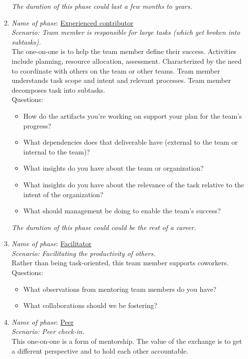 \begin{enumerate}
\begin{itemize}
    \end{itemize}
\textit{The duration of this phase could last a few months to years.}
    \item \textit{Name of phase}: \underline{Experienced contributor}\\
    \textit{Scenario: Team member is responsible for large tasks (which get broken into subtasks). }\\
    The one-on-one is to help the team member define their success. Activities include planning, resource allocation, assessment. Characterized by the need to coordinate with others on the team or other teams. Team member understands task scope and intent and relevant processes. Team member decomposes task into subtasks.\\
    Questions:
    \begin{itemize}
        \item How do the artifacts you're working on support your plan for the team's progress?
        \item What dependencies does that deliverable have (external to the team or internal to the team)?
        \item What insights do you have about the team or organization?
        \item What insights do you have about the relevance of the task relative to the intent of the organization?
        \item What should management be doing to enable the team's success?
    \end{itemize}
\textit{The duration of this phase could could be the rest of a career.}
    \item \textit{Name of phase}: \underline{Facilitator}\\
    \textit{Scenario: Facilitating the productivity of others.}\\
    Rather than being task-oriented, this team member supports coworkers. \\
    Questions:
    \begin{itemize}
        \item What observations from mentoring team members do you have?
        \item What collaborations should we be fostering?
    \end{itemize}
    \item \textit{Name of phase}: \underline{Peer}\\
    \textit{Scenario: Peer check-in.}\\ 
    This one-on-one is a form of mentorship. The value of the exchange is to get a different perspective and to hold each other accountable.
\end{enumerate}

